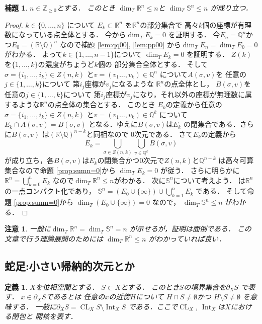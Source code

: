 \documentclass[leqno, a4paper, 12pt]{jsarticle}
\newtheorem{lem}[thm]{補題}
\newtheorem{df}[thm]{定義}
\newtheorem*{rmk}{注意}
\newcommand{\zz}{\mathbb{Z}}
\newcommand{\qq}{\mathbb{Q}}
\newcommand{\rr}{\mathbb{R}}
\DeclareMathOperator{\cl}{CL}
\DeclareMathOperator{\nai}{Int}
\begin{document}
\begin{lem}\label{lem:nnn}
$n\in \zz_{\ge 0}$とする．
このとき
$\dim_{T}\rr^{n}\le n$と
$\dim_{T}\mathbb{S}^{n}\le n$
が成り立つ．
\end{lem}
\begin{proof}
$k\in \{0, \dots, n\}$
について
$E_{k}\subset \rr^{n}$
を$\rr^{n}$の部分集合で
高々$k$個の座標が有理数になっている点全体とする．
今から$\dim_{T}E_{k}= 0$
を証明する．
今$E_{n}=\qq^{n}$かつ$E_{0}=(\rr\setminus \qq)^{n}$
なので補題 \ref{lem:qq00}, \ref{lem:pp00}
から$\dim_{T}E_{n}=\dim_{T}E_{0}=0$
がわかる．
よって$k\in \{1, \dots, n-1\}$について
$\dim_{T}E_{k}= 0$
を証明する．
$Z(k)$を$\{1, \dots, k\}$の濃度がちょうど$k$個の
部分集合全体とする．
そして$\sigma=\{i_{1}, \dots, i_{k}\}\in Z(n, k)$
と$v=(v_{1}\dots, v_{k})\in \qq^{n}$
について$A(\sigma, v)$を
任意の$j\in \{1, \dots, k\}$について
第$i_{j}$座標が$v_{j}$になるような
$\rr^{n}$の点全体とし，
$B(\sigma, v)$を
任意の$j\in \{1, \dots, k\}$について
第$i_{j}$座標が$v_{j}$になり，それ以外の座標が無理数に属するような$\rr^{n}$の点全体の集合とする．
このとき
$E_{k}$の定義から任意の$\sigma=\{i_{1}, \dots, i_{k}\}\in Z(n, k)$
と$v=(v_{1}\dots, v_{k})\in \qq^{k}$
について$E_{k}\cap A(\sigma, v)=B(\sigma, v)$
となる．ゆえに$B(\sigma, v)$は$E_{k}$
の閉集合である．さらに$B(\sigma, v)$
は$(\rr\setminus \qq)^{n-k}$と同相なので
$0$次元である．
さて$E_{k}$の定義から
\[
E_{k}=\bigcup_{\sigma\in Z(n, k)}\bigcup_{v\in \qq^{k}}
B(\sigma, v)
\]
が成り立ち，各$B(\sigma, v)$は$E_{k}$の閉集合かつ$0$次元で$Z(n, k)$と$\qq^{n-k}$
は高々可算集合なので命題 \ref{prop:sumn=0}から
$\dim_{T}E_{k}=0$
が従う．
さらに明らかに$\rr^{n}=\bigcup_{k=0}^{n}E_{k}$
なので$\dim_{T}\rr^{n}\le n$がわかる．
次に$\mathbb{S}^{n}$について考えよう．
は$\rr^{n}$の一点コンパクト化であり，
$\mathbb{S}^{n}=(E_{0}\cup\{\infty\})\cup \bigcup_{k=1}^{n}E_{k}$
である．
そして命題 \ref{prop:sumn=0}から
$\dim_{T}(E_{0}\cup\{\infty\})= 0$
なので，
$\dim_{T}\mathbb{S}^{n}\le n$
がわかる．
\end{proof}
\begin{rmk}
一般に$\dim_{T}\rr^{n}=\dim_{T}\mathbb{S}^{n}=n$
が示せるが，証明は面倒である．
この文章で行う理論展開のためには
$\dim_{T}\rr^{n}\le n$
がわかっていれば良い．
\end{rmk}

\subsection{蛇足:小さい帰納的次元とか}

\begin{df}
$X$を位相空間とする．
$S\subset X$とする．
このとき$S$の境界集合を$\partial_{X}S$
で表す．
$x\in \partial_{X}S$であるとは
任意の$x$の近傍$H$について
$H\cap S\neq \emptyset$かつ
$H\setminus S\neq \emptyset$
を意味する．
一般に$\partial_{X}S=\cl_{X}S\setminus \nai_{X}S$
である．ここで$\cl_{X}$, $\nai_{X}$は$X$における閉包と
開核を表す．
\end{df}
\end{document}
